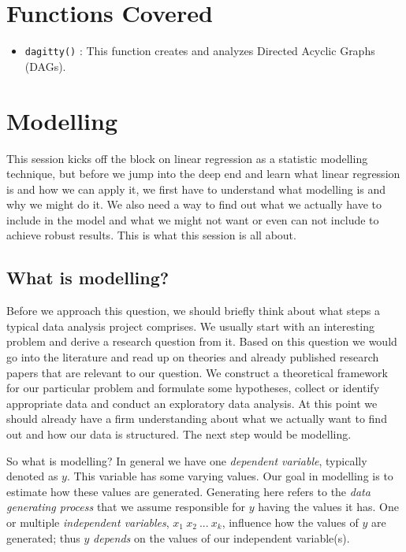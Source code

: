\documentclass[
]{book}
\providecommand{\tightlist}{%
  \setlength{\itemsep}{0pt}\setlength{\parskip}{0pt}}
\begin{document}
\hypertarget{functions-covered}{%
\section{Functions Covered}\label{functions-covered}}

\begin{itemize}
\tightlist
\item
  \texttt{dagitty()} : This function creates and analyzes Directed Acyclic Graphs (DAGs).
\end{itemize}

\hypertarget{modelling}{%
\section{Modelling}\label{modelling}}

This session kicks off the block on linear regression as a statistic
modelling technique, but before we jump into the deep end and learn what
linear regression is and how we can apply it, we first have to understand
what modelling is and why we might do it. We also need a way to find out what we actually have to include in the model and what we might not want or even can not include to achieve robust results. This is what this session is all about.

\hypertarget{what-is-modelling}{%
\subsection{What is modelling?}\label{what-is-modelling}}

Before we approach this question, we should briefly think about what steps a
typical data analysis project comprises. We usually start with an interesting
problem and derive a research question from it. Based on this question we would go into the literature and read up on theories and already published research papers that are relevant to our question. We construct a theoretical framework for our particular problem and formulate some hypotheses, collect or identify appropriate data and conduct an exploratory data analysis. At this point we should already have a firm understanding about what we actually want to find out and how our data is structured. The next step would be modelling.

So what is modelling? In general we have one \emph{dependent variable}, typically
denoted as \(y\). This variable has some varying values. Our goal in modelling is to estimate how these values are generated. Generating here refers to the
\emph{data generating process} that we assume responsible for \(y\) having the values
it has. One or multiple \emph{independent variables}, \(x_1 \ x_2 \ ... \ x_k\),
influence how the values of \(y\) are generated; thus \(y\) \emph{depends} on the values of our independent variable(s).
\end{document}
